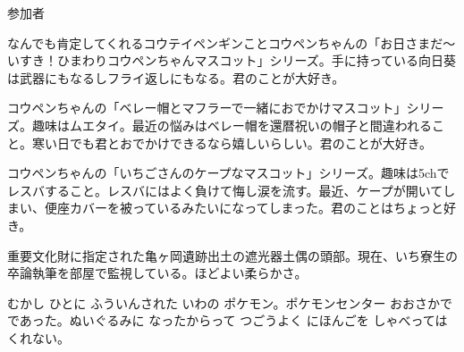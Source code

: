 \documentclass[9pt,4aj]{jsarticle}
\begin{document}
\begin{itembox}[m]{\LARGE 参加者}
{
なんでも肯定してくれるコウテイペンギンことコウペンちゃんの「お日さまだ〜いすき！ひまわりコウペンちゃんマスコット」シリーズ。手に持っている向日葵は武器にもなるしフライ返しにもなる。君のことが大好き。

コウペンちゃんの「ベレー帽とマフラーで一緒におでかけマスコット」シリーズ。趣味はムエタイ。最近の悩みはベレー帽を還暦祝いの帽子と間違われること。寒い日でも君とおでかけできるなら嬉しいらしい。君のことが大好き。

コウペンちゃんの「いちごさんのケープなマスコット」シリーズ。趣味は5chでレスバすること。レスバにはよく負けて悔し涙を流す。最近、ケープが開いてしまい、便座カバーを被っているみたいになってしまった。君のことはちょっと好き。

重要文化財に指定された亀ヶ岡遺跡出土の遮光器土偶の頭部。現在、いち寮生の卒論執筆を部屋で監視している。ほどよい柔らかさ。

むかし ひとに ふういんされた いわの ポケモン。ポケモンセンター おおさかで であった。ぬいぐるみに なったからって つごうよく にほんごを しゃべっては くれない。
}
\end{itembox}
\end{document}
